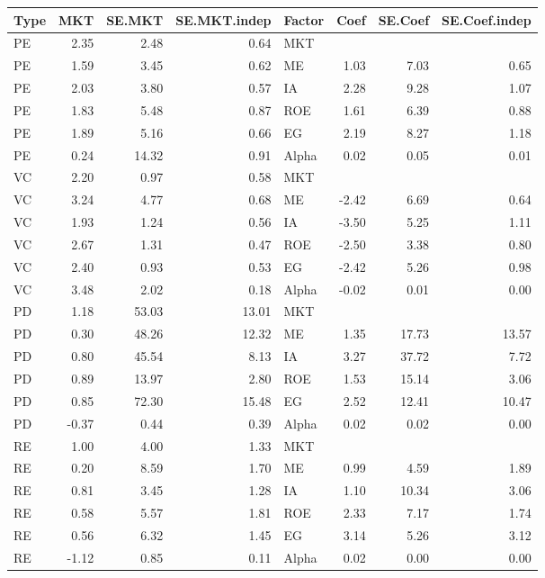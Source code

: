 \documentclass[12pt]{article}
\begin{document}
\begin{table}[ht]
	\centering
	\begin{tabular}{lrrrlrrr}
		\hline
		Type & MKT & SE.MKT & SE.MKT.indep & Factor & Coef & SE.Coef & SE.Coef.indep \\ 
		\hline
		PE & 2.35 & 2.48 & 0.64 & MKT &  &  &  \\ 
		PE & 1.59 & 3.45 & 0.62 & ME & 1.03 & 7.03 & 0.65 \\ 
		PE & 2.03 & 3.80 & 0.57 & IA & 2.28 & 9.28 & 1.07 \\ 
		PE & 1.83 & 5.48 & 0.87 & ROE & 1.61 & 6.39 & 0.88 \\ 
		PE & 1.89 & 5.16 & 0.66 & EG & 2.19 & 8.27 & 1.18 \\ 
		PE & 0.24 & 14.32 & 0.91 & Alpha & 0.02 & 0.05 & 0.01 \\ 
		VC & 2.20 & 0.97 & 0.58 & MKT &  &  &  \\ 
		VC & 3.24 & 4.77 & 0.68 & ME & -2.42 & 6.69 & 0.64 \\ 
		VC & 1.93 & 1.24 & 0.56 & IA & -3.50 & 5.25 & 1.11 \\ 
		VC & 2.67 & 1.31 & 0.47 & ROE & -2.50 & 3.38 & 0.80 \\ 
		VC & 2.40 & 0.93 & 0.53 & EG & -2.42 & 5.26 & 0.98 \\ 
		VC & 3.48 & 2.02 & 0.18 & Alpha & -0.02 & 0.01 & 0.00 \\ 
		PD & 1.18 & 53.03 & 13.01 & MKT &  &  &  \\ 
		PD & 0.30 & 48.26 & 12.32 & ME & 1.35 & 17.73 & 13.57 \\ 
		PD & 0.80 & 45.54 & 8.13 & IA & 3.27 & 37.72 & 7.72 \\ 
		PD & 0.89 & 13.97 & 2.80 & ROE & 1.53 & 15.14 & 3.06 \\ 
		PD & 0.85 & 72.30 & 15.48 & EG & 2.52 & 12.41 & 10.47 \\ 
		PD & -0.37 & 0.44 & 0.39 & Alpha & 0.02 & 0.02 & 0.00 \\ 
		RE & 1.00 & 4.00 & 1.33 & MKT &  &  &  \\ 
		RE & 0.20 & 8.59 & 1.70 & ME & 0.99 & 4.59 & 1.89 \\ 
		RE & 0.81 & 3.45 & 1.28 & IA & 1.10 & 10.34 & 3.06 \\ 
		RE & 0.58 & 5.57 & 1.81 & ROE & 2.33 & 7.17 & 1.74 \\ 
		RE & 0.56 & 6.32 & 1.45 & EG & 3.14 & 5.26 & 3.12 \\ 
		RE & -1.12 & 0.85 & 0.11 & Alpha & 0.02 & 0.00 & 0.00 \\ 

\end{tabular}
\end{table}
\end{document}

